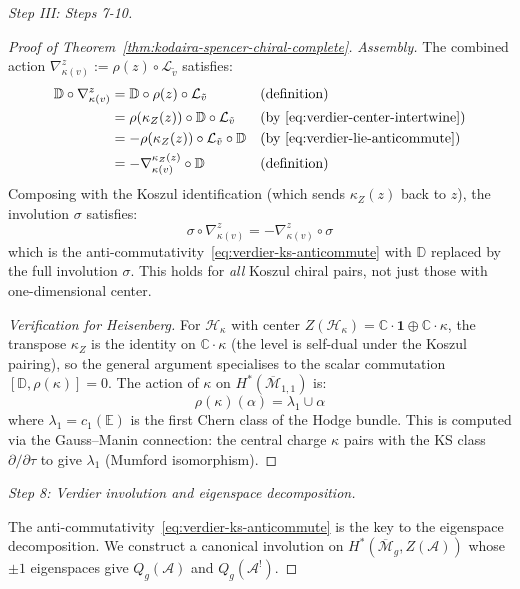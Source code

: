 \begin{proof}[Step III: Steps 7-10]
\begin{proof}[Proof of Theorem~\ref{thm:kodaira-spencer-chiral-complete}]
\emph{Assembly.}  The combined action $\nabla_{\kappa(v)}^z := \rho(z) \circ
\mathcal{L}_{\tilde{v}}$ satisfies:
\begin{align}
\mathbb{D} \circ \nabla_{\kappa(v)}^z
&= \mathbb{D} \circ \rho(z) \circ \mathcal{L}_{\tilde{v}}
&& \text{(definition)} \\
&= \rho(\kappa_Z(z)) \circ \mathbb{D} \circ \mathcal{L}_{\tilde{v}}
&& \text{(by~\eqref{eq:verdier-center-intertwine})} \\
&= -\rho(\kappa_Z(z)) \circ \mathcal{L}_{\tilde{v}} \circ \mathbb{D}
&& \text{(by~\eqref{eq:verdier-lie-anticommute})} \\
&= -\nabla_{\kappa(v)}^{\kappa_Z(z)} \circ \mathbb{D}
&& \text{(definition)}
\end{align}
Composing with the Koszul identification (which sends $\kappa_Z(z)$ back to $z$), the
involution $\sigma$ satisfies:
\begin{equation}
\sigma \circ \nabla_{\kappa(v)}^z = -\nabla_{\kappa(v)}^z \circ \sigma
\end{equation}
which is the anti-commutativity~\eqref{eq:verdier-ks-anticommute} with $\mathbb{D}$
replaced by the full involution $\sigma$.  This holds for \emph{all} Koszul chiral
pairs, not just those with one-dimensional center.

\emph{Verification for Heisenberg.}  For $\mathcal{H}_\kappa$ with center
$Z(\mathcal{H}_\kappa) = \mathbb{C} \cdot \mathbf{1} \oplus \mathbb{C} \cdot \kappa$,
the transpose $\kappa_Z$ is the identity on $\mathbb{C} \cdot \kappa$ (the level is
self-dual under the Koszul pairing), so the general argument specialises to the
scalar commutation $[\mathbb{D}, \rho(\kappa)] = 0$.  The action of $\kappa$ on
$H^*(\overline{\mathcal{M}}_{1,1})$ is:
\begin{equation}
\rho(\kappa)(\alpha) = \lambda_1 \cup \alpha
\end{equation}
where $\lambda_1 = c_1(\mathbb{E})$ is the first Chern class of the Hodge bundle.
This is computed via the Gauss--Manin connection: the central charge $\kappa$ pairs with
the KS class $\partial/\partial\tau$ to give $\lambda_1$ (Mumford isomorphism).
\end{proof}

\emph{Step 8: Verdier involution and eigenspace decomposition.}

The anti-commutativity~\eqref{eq:verdier-ks-anticommute} is the key to the
eigenspace decomposition.  We construct a canonical involution on $H^*(\overline{
\mathcal{M}}_g, Z(\mathcal{A}))$ whose $\pm 1$ eigenspaces give $Q_g(\mathcal{A})$
and $Q_g(\mathcal{A}^!)$.


\end{proof}
